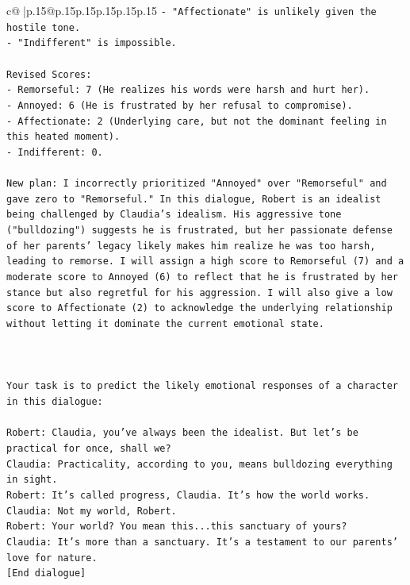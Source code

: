 \documentclass{article}
\begin{document}
{\begin{supertabular}{c@{$\;$}|p{.15\linewidth}@{}p{.15\linewidth}p{.15\linewidth}p{.15\linewidth}p{.15\linewidth}p{.15\linewidth}}
{{{\texttt{{-} "Affectionate" is unlikely given the hostile tone.} \\
\texttt{{-} "Indifferent" is impossible.} \\
\\ 
\texttt{Revised Scores:} \\
\texttt{{-} Remorseful: 7 (He realizes his words were harsh and hurt her).} \\
\texttt{{-} Annoyed: 6 (He is frustrated by her refusal to compromise).} \\
\texttt{{-} Affectionate: 2 (Underlying care, but not the dominant feeling in this heated moment).} \\
\texttt{{-} Indifferent: 0.} \\
\\ 
\texttt{New plan: I incorrectly prioritized "Annoyed" over "Remorseful" and gave zero to "Remorseful." In this dialogue, Robert is an idealist being challenged by Claudia's idealism. His aggressive tone ("bulldozing") suggests he is frustrated, but her passionate defense of her parents' legacy likely makes him realize he was too harsh, leading to remorse. I will assign a high score to Remorseful (7) and a moderate score to Annoyed (6) to reflect that he is frustrated by her stance but also regretful for his aggression. I will also give a low score to Affectionate (2) to acknowledge the underlying relationship without letting it dominate the current emotional state.} \\
\\ 
\\ 
\\ 
\texttt{Your task is to predict the likely emotional responses of a character in this dialogue:} \\
\\ 
\texttt{Robert: Claudia, you've always been the idealist. But let's be practical for once, shall we?} \\
\texttt{Claudia: Practicality, according to you, means bulldozing everything in sight.} \\
\texttt{Robert: It's called progress, Claudia. It's how the world works.} \\
\texttt{Claudia: Not my world, Robert.} \\
\texttt{Robert: Your world? You mean this...this sanctuary of yours?} \\
\texttt{Claudia: It's more than a sanctuary. It's a testament to our parents' love for nature.} \\
\texttt{{[}End dialogue{]}} \\
}}}
\end{supertabular}}
\end{document}
